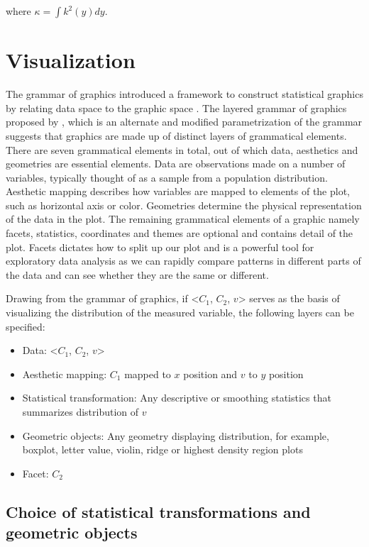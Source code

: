 \documentclass[12pt]{article}
\providecommand{\tightlist}{%
  \setlength{\itemsep}{0pt}\setlength{\parskip}{0pt}}
\begin{document}
where \(\kappa = \int k^2(y)dy\).

\hypertarget{sec:visualization}{%
\section{Visualization}\label{sec:visualization}}

The grammar of graphics introduced a framework to construct statistical graphics by relating data space to the graphic space \citep{Wilkinson1999-nk}. The layered grammar of graphics proposed by \citep{Wickham2009pk}, which is an alternate and modified parametrization of the grammar suggests that graphics are made up of distinct layers of grammatical elements. There are seven grammatical elements in total, out of which data, aesthetics and geometries are essential elements. Data are observations made on a number of variables, typically thought of as a sample from a population distribution. Aesthetic mapping describes how variables are mapped to elements of the plot, such as horizontal axis or color. Geometries determine the physical representation of the data in the plot. The remaining grammatical elements of a graphic namely facets, statistics, coordinates and themes are optional and contains detail of the plot. Facets dictates how to split up our plot and is a powerful tool for exploratory data analysis as we can rapidly compare patterns in different parts of the data and can see whether they are the same or different.

Drawing from the grammar of graphics, if \textless{}\(C_1\), \(C_2\), \(v\)\textgreater{} serves as the basis of visualizing the distribution of the measured variable, the following layers can be specified:

\begin{itemize}
\tightlist
\item
  Data: \textless{}\(C_1\), \(C_2\), \(v\)\textgreater{}
\item
  Aesthetic mapping: \(C_1\) mapped to \(x\) position and \(v\) to \(y\) position
\item
  Statistical transformation: Any descriptive or smoothing statistics that summarizes distribution of \(v\)
\item
  Geometric objects: Any geometry displaying distribution, for example, boxplot, letter value, violin, ridge or highest density region plots
\item
  Facet: \(C_2\)
\end{itemize}

\hypertarget{choice-of-statistical-transformations-and-geometric-objects}{%
\subsection{Choice of statistical transformations and geometric objects}\label{choice-of-statistical-transformations-and-geometric-objects}}
\end{document}

